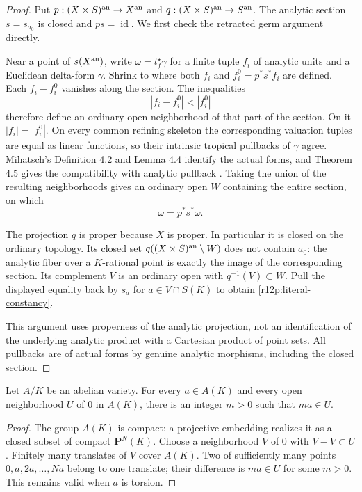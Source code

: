 \begin{proof}
Put $p:(X\times S)^{\rm an}\to X^{\rm an}$ and
$q:(X\times S)^{\rm an}\to S^{\rm an}$.  The analytic section
$s=s_{a_0}$ is closed and $ps=\operatorname{id}$.  We first check
the retracted germ argument directly.

Near a point of $s(X^{\rm an})$, write
$\omega=t_f^\star\gamma$ for a finite tuple $f_i$ of analytic units
and a Euclidean delta-form $\gamma$.  Shrink to where both $f_i$ and
$f_i^0=p^*s^*f_i$ are defined.  Each $f_i-f_i^0$ vanishes along the
section.  The inequalities
\[
                         |f_i-f_i^0|<|f_i^0|
\]
therefore define an ordinary open neighborhood of that part of the
section.  On it $|f_i|=|f_i^0|$.  On every common refining skeleton
the corresponding valuation tuples are equal as linear functions,
so their intrinsic tropical pullbacks of $\gamma$ agree.  Mihatsch's
Definition 4.2 and Lemma 4.4 identify the actual forms, and Theorem 4.5
gives the compatibility with analytic pullback \cite{M}.  Taking the
union of the resulting neighborhoods gives an ordinary open $W$
containing the entire section, on which
\[
                         \omega=p^*s^*\omega.
\]

The projection $q$ is proper because $X$ is proper.  In particular it
is closed on the ordinary topology.  Its closed set
$q((X\times S)^{\rm an}\setminus W)$ does not contain $a_0$:
the analytic fiber over a $K$-rational point is exactly the image of
the corresponding section.  Its complement $V$ is an ordinary open
with $q^{-1}(V)\subset W$.  Pull the displayed equality back by
$s_a$ for $a\in V\cap S(K)$ to obtain
\eqref{r12p:literal-constancy}.

This argument uses properness of the analytic projection, not an
identification of the underlying analytic product with a Cartesian
product of point sets.  All pullbacks are of actual forms by genuine
analytic morphisms, including the closed section.
\end{proof}

\begin{lemma}
\label{r12p:compact-multiple}
Let $A/K$ be an abelian variety.  For every $a\in A(K)$ and every
open neighborhood $U$ of $0$ in $A(K)$, there is an integer $m>0$
such that $ma\in U$.
\end{lemma}

\begin{proof}
The group $A(K)$ is compact: a projective embedding realizes it as
a closed subset of compact $\mathbf P^N(K)$.  Choose a neighborhood
$V$ of $0$ with $V-V\subset U$.  Finitely many translates of $V$
cover $A(K)$.  Two of sufficiently many points $0,a,2a,\ldots,Na$
belong to one translate; their difference is $ma\in U$ for some
$m>0$.  This remains valid when $a$ is torsion.
\end{proof}

